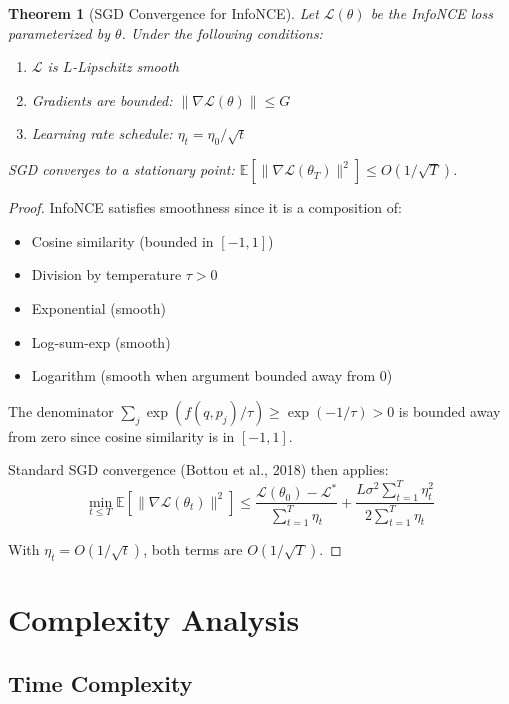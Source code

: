 \documentclass[11pt]{article}
\newtheorem{theorem}{Theorem}
\begin{document}
\begin{theorem}[SGD Convergence for InfoNCE]
\label{thm:convergence_full}
Let $\mathcal{L}(\theta)$ be the InfoNCE loss parameterized by $\theta$. Under the following conditions:
\begin{enumerate}
    \item $\mathcal{L}$ is $L$-Lipschitz smooth
    \item Gradients are bounded: $\|\nabla \mathcal{L}(\theta)\| \leq G$
    \item Learning rate schedule: $\eta_t = \eta_0 / \sqrt{t}$
\end{enumerate}
SGD converges to a stationary point: $\mathbb{E}[\|\nabla \mathcal{L}(\theta_T)\|^2] \leq O(1/\sqrt{T})$.
\end{theorem}

\begin{proof}
InfoNCE satisfies smoothness since it is a composition of:
\begin{itemize}
    \item Cosine similarity (bounded in $[-1, 1]$)
    \item Division by temperature $\tau > 0$
    \item Exponential (smooth)
    \item Log-sum-exp (smooth)
    \item Logarithm (smooth when argument bounded away from 0)
\end{itemize}

The denominator $\sum_j \exp(f(q, p_j)/\tau) \geq \exp(-1/\tau) > 0$ is bounded away from zero since cosine similarity is in $[-1, 1]$.

Standard SGD convergence (Bottou et al., 2018) then applies:
\begin{equation}
\min_{t \leq T} \mathbb{E}[\|\nabla \mathcal{L}(\theta_t)\|^2] \leq \frac{\mathcal{L}(\theta_0) - \mathcal{L}^*}{\sum_{t=1}^T \eta_t} + \frac{L\sigma^2 \sum_{t=1}^T \eta_t^2}{2\sum_{t=1}^T \eta_t}
\end{equation}

With $\eta_t = O(1/\sqrt{t})$, both terms are $O(1/\sqrt{T})$.
\end{proof}

\section{Complexity Analysis}
\label{sec:complexity}

\subsection{Time Complexity}
\end{document}
